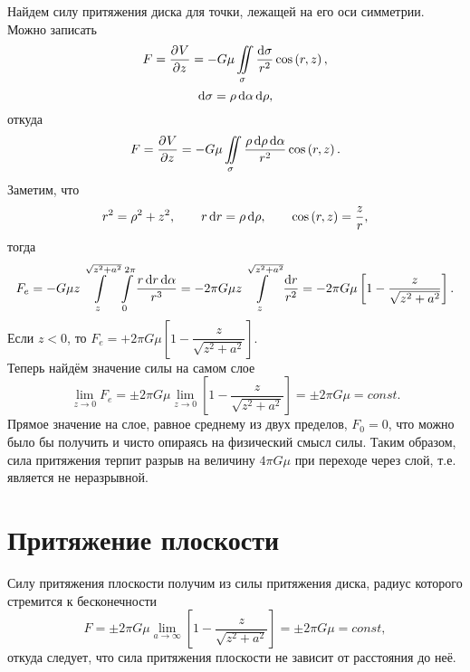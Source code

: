 \documentclass[11pt, a4paper]{article}
\theoremstyle{plain}
\theoremstyle{definition}
\theoremstyle{remark}
\begin{document}
Найдем силу притяжения диска для точки, лежащей на его оси симметрии. Можно записать
\begin{equation*}
    F = \dpd{V}{z} = - G\mu\iint\limits_{\sigma}\dfrac{\dif\sigma}{r^2}\cos\left( r, z \right),
\end{equation*}
\begin{equation*}
    \dif\sigma = \rho\dif\alpha\dif\rho,
\end{equation*}
откуда
\begin{equation*}
    F = \dpd{V}{z} = - G\mu\iint\limits_{\sigma}\dfrac{\rho\dif\rho\dif\alpha}{r^2}\cos\left( r, z \right).
\end{equation*}
Заметим, что
\begin{equation*}
    r^2 = \rho^2 + z^2,\qquad r\dif r = \rho\dif \rho,\qquad \cos\left( r, z \right) = \dfrac{z}{r},
\end{equation*}
тогда
\begin{equation*}
    F_e = - G\mu z \int\limits_{z}^{\sqrt{z^2 + a^2}}\int\limits_{0}^{2\pi}\dfrac{r\dif
    r\dif\alpha}{r^3} = -2\pi G\mu z\int\limits_{z}^{\sqrt{z^2 + a^2}}\dfrac{\dif r}{r^2} =
    -2\pi G\mu\left[ 1 - \dfrac{z}{\sqrt{z^2 + a^2}}\right].
\end{equation*}
Если $z < 0$, то $F_e = +2\pi G\mu\left[ 1 - \dfrac{z}{\sqrt{z^2 + a^2}}\right]$. \\
Теперь найдём значение силы на самом слое
\begin{equation*}
    \lim\limits_{z\to 0} F_e = \pm2\pi G\mu\lim\limits_{z\to 0} \left[ 1 - \dfrac{z}{\sqrt{z^2 +
    a^2}}\right] = \pm2\pi G\mu = const.
\end{equation*}
Прямое значение на слое, равное среднему из двух пределов, $F_0 = 0$, что можно было бы получить и
чисто опираясь на физический смысл силы. Таким образом, сила притяжения
терпит разрыв на величину $4\pi G\mu$ при переходе через слой, т.е. является не неразрывной.

\section{Притяжение плоскости}
Силу притяжения плоскости получим из силы притяжения диска, радиус которого стремится к
бесконечности
\begin{equation*}
    F = \pm2\pi G\mu\lim\limits_{a\to\infty} \left[ 1 - \dfrac{z}{\sqrt{z^2 + a^2}}\right] =
    \pm2\pi G\mu = const,
\end{equation*}
откуда следует, что сила притяжения плоскости не зависит от расстояния до неё.
\end{document}
